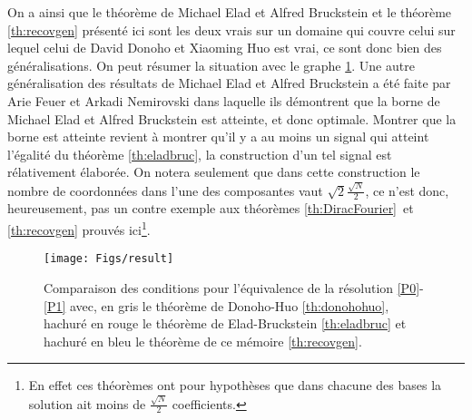 \newline
On a ainsi que le théorème de Michael Elad et Alfred Bruckstein et le théorème \ref{th:recovgen} présenté ici sont les deux vrais sur un domaine qui couvre celui sur lequel celui de David Donoho et Xiaoming Huo est vrai, ce sont donc bien des généralisations.
On peut résumer la situation avec le graphe \ref{fig:result}.
\newline
Une autre généralisation des résultats de Michael Elad et Alfred Bruckstein a été faite par Arie Feuer et Arkadi Nemirovski \cite{feuer} dans laquelle ils démontrent que la borne de Michael Elad et Alfred Bruckstein est atteinte, et donc optimale.
Montrer que  la borne est atteinte revient à montrer qu'il y a au moins un signal qui atteint l'égalité du théorème \ref{th:eladbruc}, la construction d'un tel signal est rélativement élaborée. 
On notera seulement que dans cette construction le nombre de coordonnées dans l'une des composantes vaut $\sqrt{2}\frac{\sqrt{N}}{2}$, ce n'est donc, heureusement, pas un contre exemple aux théorèmes \ref{th:DiracFourier} et \ref{th:recovgen} prouvés ici\footnote{En effet ces théorèmes ont pour hypothèses que dans chacune des bases la solution ait moins de $\frac{\sqrt{N}}{2}$ coefficients.}.

\begin{figure}
	\texttt{[image: Figs/result]}
	\caption{Comparaison des conditions pour l'équivalence de la résolution \ref{P0}-\ref{P1} avec, en gris le théorème de Donoho-Huo \ref{th:donohohuo}, hachuré en rouge le théorème de Elad-Bruckstein \ref{th:eladbruc} et hachuré en bleu le théorème de ce mémoire \ref{th:recovgen}.\label{fig:result}}
\end{figure}

